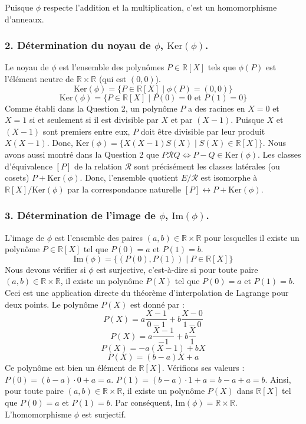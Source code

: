 \documentclass{report}
\begin{document}
Puisque $\phi$ respecte l'addition et la multiplication, c'est un homomorphisme d'anneaux.

\subsubsection*{2. Détermination du noyau de $\phi$, $\text{Ker}(\phi)$.}
Le noyau de $\phi$ est l'ensemble des polynômes $P \in \mathbb{R}[X]$ tels que $\phi(P)$ est l'élément neutre de $\mathbb{R} \times \mathbb{R}$ (qui est $(0,0)$).
$$\text{Ker}(\phi) = \{P \in \mathbb{R}[X] \mid \phi(P) = (0,0)\}$$
$$\text{Ker}(\phi) = \{P \in \mathbb{R}[X] \mid P(0)=0 \text{ et } P(1)=0\}$$
Comme établi dans la Question 2, un polynôme $P$ a des racines en $X=0$ et $X=1$ si et seulement si il est divisible par $X$ et par $(X-1)$. Puisque $X$ et $(X-1)$ sont premiers entre eux, $P$ doit être divisible par leur produit $X(X-1)$.
Donc, $\text{Ker}(\phi) = \{X(X-1)S(X) \mid S(X) \in \mathbb{R}[X]\}$.
Nous avons aussi montré dans la Question 2 que $P \mathcal{R} Q \iff P-Q \in \text{Ker}(\phi)$.
Les classes d'équivalence $[P]$ de la relation $\mathcal{R}$ sont précisément les classes latérales (ou cosets) $P + \text{Ker}(\phi)$.
Donc, l'ensemble quotient $E/\mathcal{R}$ est isomorphe à $\mathbb{R}[X]/\text{Ker}(\phi)$ par la correspondance naturelle $[P] \leftrightarrow P + \text{Ker}(\phi)$.

\subsubsection*{3. Détermination de l'image de $\phi$, $\text{Im}(\phi)$.}
L'image de $\phi$ est l'ensemble des paires $(a,b) \in \mathbb{R} \times \mathbb{R}$ pour lesquelles il existe un polynôme $P \in \mathbb{R}[X]$ tel que $P(0)=a$ et $P(1)=b$.
$$\text{Im}(\phi) = \{(P(0), P(1)) \mid P \in \mathbb{R}[X]\}$$
Nous devons vérifier si $\phi$ est surjective, c'est-à-dire si pour toute paire $(a,b) \in \mathbb{R} \times \mathbb{R}$, il existe un polynôme $P(X)$ tel que $P(0)=a$ et $P(1)=b$.
Ceci est une application directe du théorème d'interpolation de Lagrange pour deux points.
Le polynôme $P(X)$ est donné par :
$$P(X) = a \frac{X-1}{0-1} + b \frac{X-0}{1-0}$$
$$P(X) = a \frac{X-1}{-1} + b \frac{X}{1}$$
$$P(X) = -a(X-1) + bX$$
$$P(X) = (b-a)X + a$$
Ce polynôme est bien un élément de $\mathbb{R}[X]$.
Vérifions ses valeurs :
$P(0) = (b-a) \cdot 0 + a = a$.
$P(1) = (b-a) \cdot 1 + a = b-a+a = b$.
Ainsi, pour toute paire $(a,b) \in \mathbb{R} \times \mathbb{R}$, il existe un polynôme $P(X)$ dans $\mathbb{R}[X]$ tel que $P(0)=a$ et $P(1)=b$.
Par conséquent, $\text{Im}(\phi) = \mathbb{R} \times \mathbb{R}$. L'homomorphisme $\phi$ est surjectif.
\end{document}
